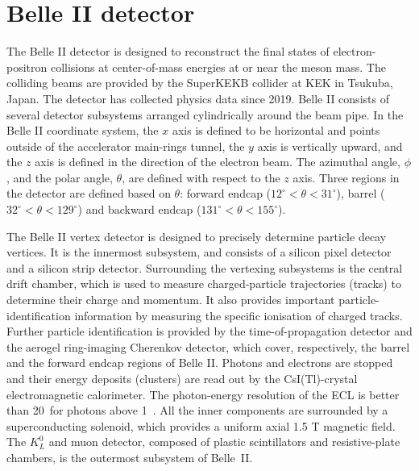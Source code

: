 \section{Belle II detector}

The Belle II \cite{Belle-II:2010dht} detector is designed to reconstruct the final states of electron-positron collisions at center-of-mass energies at or near the \FourS meson mass. The colliding \epem beams are provided by the SuperKEKB collider \cite{AKAI2018188} at KEK in Tsukuba, Japan. The detector has collected physics data since 2019. Belle II consists of several detector subsystems arranged cylindrically around the beam pipe. In the Belle II coordinate system, the $x$ axis is defined to be horizontal and points outside of the accelerator main-rings tunnel, the $y$ axis is vertically upward, and the $z$ axis is defined in the direction of the electron beam. The azimuthal angle, $\phi$, and the polar angle, $\theta$, are defined with respect to the $z$ axis. Three regions in the detector are defined based on $\theta$: forward endcap (\mbox{$12^{\circ}<\theta<31^{\circ}$}), barrel (\mbox{$32^{\circ}<\theta<129^{\circ}$}) and backward endcap (\mbox{$131^{\circ}<\theta<155^{\circ}$}).

The Belle II vertex detector is designed to precisely determine particle decay vertices. It is the innermost subsystem, and consists of a silicon pixel detector and a silicon strip detector. Surrounding the vertexing subsystems is the central drift chamber,
which is used to measure charged-particle trajectories (tracks) to determine their charge and momentum. It also provides important particle-identification information by measuring the specific ionisation of charged tracks. Further particle identification is provided by the time-of-propagation detector and the aerogel ring-imaging Cherenkov detector, which cover, respectively, the barrel and the forward endcap regions of Belle II. Photons and electrons are stopped and their energy deposits (clusters) are read out by the CsI(Tl)-crystal electromagnetic calorimeter. The photon-energy resolution of the ECL is better than 20~\mev for photons above 1~\gev.
All the inner components are surrounded by a superconducting solenoid, which provides a uniform axial 1.5 T magnetic field. The $K^0_L$ and muon detector, composed of plastic scintillators and resistive-plate chambers, is the outermost subsystem of Belle~II.

